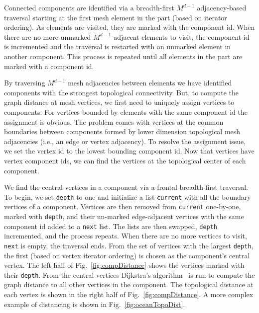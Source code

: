 Connected components are identified via a breadth-first $M^{d-1}$
adjacency-based traversal starting at the first mesh element in
the part (based on iterator ordering).
As elements are visited, they are marked with the component id.
When there are no more unmarked $M^{d-1}$ adjacent elements to visit, the
component id is incremented and the traversal is restarted with an unmarked
element in another component.
This process is repeated until all elements in the part are marked with a
component id.

By traversing $M^{d-1}$ mesh adjacencies between elements we have identified
components with the strongest topological connectivity.
But, to compute the graph distance at mesh vertices, we first need to uniquely
assign vertices to components.
For vertices bounded by elements with the same component id the assignment is
obvious.
The problem comes with vertices at the common boundaries between components
formed by lower dimension topological mesh adjacencies (i.e., an edge or vertex
adjacency).
To resolve the assignment issue, we set the vertex id to the lowest bounding
component id.
Now that vertices have vertex component ids, we can find the vertices at the
topological center of each component.

We find the central vertices in a component via a frontal breadth-first traversal.
To begin, we set \texttt{depth} to one and initialize a list \texttt{current}
with all the boundary vertices of a component.
Vertices are then removed from \texttt{current} one-by-one, marked with
\texttt{depth}, and their un-marked edge-adjacent vertices with the same
component id added to a \texttt{next} list.
The lists are then swapped, \texttt{depth} incremented, and the process
repeats.
When there are no more vertices to visit, \texttt{next} is empty, the traversal
ends.
From the set of vertices with the largest \texttt{depth}, the first (based on
vertex iterator ordering) is chosen as the component's central vertex.
The left half of Fig.~\ref{fig:compDistance} shows
the vertices marked with their \texttt{depth}.
From the central vertices Dijkstra's algorithm~\cite{cormen2001introduction} is
run to compute the graph distance to all other vertices in the component.
The topological distance at each vertex is shown in the right half of
Fig.~\ref{fig:compDistance}.
A more complex example of distancing is shown in
Fig.~\ref{fig:oceanTopoDist}.

